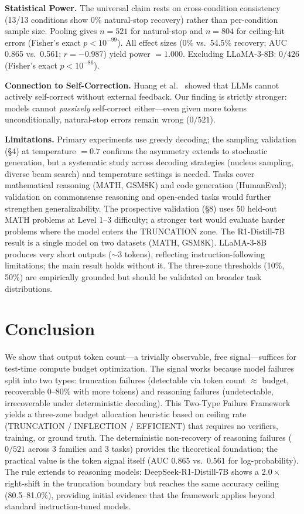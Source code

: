 \documentclass{article}
\begin{document}
\textbf{Statistical Power.}
The universal claim rests on cross-condition consistency (13/13 conditions show 0\% natural-stop recovery) rather than per-condition sample size. Pooling gives $n=521$ for natural-stop and $n=804$ for ceiling-hit errors (Fisher's exact $p < 10^{-99}$). All effect sizes (0\% vs.\ 54.5\% recovery; AUC 0.865 vs.\ 0.561; $r = -0.987$) yield power $= 1.000$. Excluding LLaMA-3-8B: $0/426$ (Fisher's exact $p < 10^{-86}$).

\textbf{Connection to Self-Correction.}
Huang et al.~\cite{huang2023selfcorrect} showed that LLMs cannot actively self-correct without external feedback. Our finding is strictly stronger: models cannot \emph{passively} self-correct either---even given more tokens unconditionally, natural-stop errors remain wrong ($0/521$).

\textbf{Limitations.}
Primary experiments use greedy decoding; the sampling validation (\S4) at temperature $= 0.7$ confirms the asymmetry extends to stochastic generation, but a systematic study across decoding strategies (nucleus sampling, diverse beam search) and temperature settings is needed. Tasks cover mathematical reasoning (MATH, GSM8K) and code generation (HumanEval); validation on commonsense reasoning and open-ended tasks would further strengthen generalizability. The prospective validation (\S8) uses 50 held-out MATH problems at Level 1--3 difficulty; a stronger test would evaluate harder problems where the model enters the TRUNCATION zone. The R1-Distill-7B result is a single model on two datasets (MATH, GSM8K). LLaMA-3-8B produces very short outputs ($\sim$3 tokens), reflecting instruction-following limitations; the main result holds without it. The three-zone thresholds (10\%, 50\%) are empirically grounded but should be validated on broader task distributions.

\section{Conclusion}

We show that output token count---a trivially observable, free signal---suffices for test-time compute budget optimization. The signal works because model failures split into two types: truncation failures (detectable via token count $\approx$ budget, recoverable 0--80\% with more tokens) and reasoning failures (undetectable, irrecoverable under deterministic decoding). This Two-Type Failure Framework yields a three-zone budget allocation heuristic based on ceiling rate (TRUNCATION / INFLECTION / EFFICIENT) that requires no verifiers, training, or ground truth. The deterministic non-recovery of reasoning failures ($0/521$ across 3 families and 3 tasks) provides the theoretical foundation; the practical value is the token signal itself (AUC $0.865$ vs.\ $0.561$ for log-probability). The rule extends to reasoning models: DeepSeek-R1-Distill-7B shows a $2.0\times$ right-shift in the truncation boundary but reaches the same accuracy ceiling (80.5--81.0\%), providing initial evidence that the framework applies beyond standard instruction-tuned models.
\end{document}

